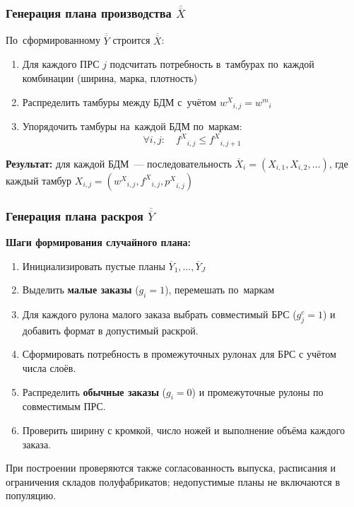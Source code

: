 \begin{frame}
    \frametitle{Генерация плана производства $\overline{\overline{X}}$}
    По~сформированному $\overline{\overline{Y}}$ строится $\overline{\overline{X}}$:

    \vspace{0.3cm}
    \begin{enumerate}
        \item Для каждого ПРС $j$ подсчитать потребность в~тамбурах по~каждой комбинации (ширина, марка, плотность)
        \item Распределить тамбуры между БДМ с~учётом ${w^X}_{i,j}={w^m}_i$
        \item Упорядочить тамбуры на~каждой БДМ по~маркам:
        \[
        \forall i,j:\quad {f^X}_{i,j} \le {f^X}_{i,j+1}
        \]
    \end{enumerate}

    \vspace{0.3cm}
    \textbf{Результат:} для каждой БДМ~--- последовательность $\overline{X}_i=(X_{i,1},X_{i,2},\ldots)$, где каждый тамбур $X_{i,j}=({w^X}_{i,j},{f^X}_{i,j},{p^X}_{i,j})$
\end{frame}

\begin{frame}
    \frametitle{Генерация плана раскроя $\overline{\overline{Y}}$}
    \small
    \textbf{Шаги формирования случайного плана:}
    \begin{enumerate}
        \item Инициализировать пустые планы $\overline{Y}_1,\ldots,\overline{Y}_J$
        \item Выделить \textbf{малые заказы} ($g_i{=}1$), перемешать по~маркам
        \item Для каждого рулона малого заказа выбрать совместимый БРС ($g^c_j{=}1$) и добавить формат в допустимый раскрой.
        \item Сформировать потребность в промежуточных рулонах для БРС с учётом числа слоёв.
        \item Распределить \textbf{обычные заказы} ($g_i{=}0$) и промежуточные рулоны по совместимым ПРС.
        \item Проверить ширину с кромкой, число ножей и выполнение объёма каждого заказа.
    \end{enumerate}

    \vspace{0.2cm}
    При построении проверяются также согласованность выпуска, расписания и ограничения складов полуфабрикатов; недопустимые планы не включаются в популяцию.
\end{frame}

